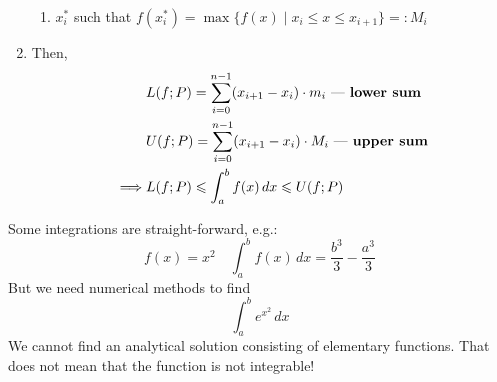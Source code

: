 \begin{enumerate}
{\begin{enumerate}
            \item {
                $x_i^*$ such that $f(x_i^*) = \max\{ f(x) \mid x_i \le x \le x_{i+1} \} =: M_i$
            }
        \end{enumerate}
    }
    \item {
        Then, 
        \begin{align*}
            &
            L(f; P) = \sum_{i=0}^{n-1} (x_{i+1} - x_i) \cdot m_i \text{ --- \textbf{lower sum}}
            \\&
            U(f; P) = \sum_{i=0}^{n-1} (x_{i+1} - x_i) \cdot M_i \text{ --- \textbf{upper sum}}
            \\\implies
            &L(f; P) \le \int_a^b f(x) \,dx \le U(f; P)
        \end{align*}
    }
\end{enumerate}

Some integrations are straight-forward, e.g.:
\[
    f(x) = x^2 \quad \int_a^b f(x)\,dx = \frac{b^3}{3} - \frac{a^3}{3}
\]
But we need numerical methods to find
\[ \int_a^b e^{x^2} \,dx \]
We cannot find an analytical solution consisting of elementary functions. That does not mean
that the function is not integrable!
